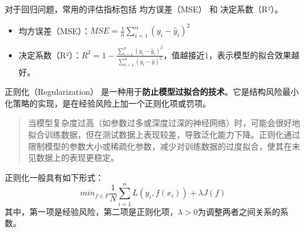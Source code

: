 \documentclass[12pt]{article}
\begin{document}
对于回归问题，常用的评估指标包括 均方误差（MSE） 和 决定系数（R²）。
\begin{itemize}
    \item 均方误差（MSE）：$MSE = \frac{1}{n} \sum_{i=1}^{n} (y_i - \hat{y}_i)^2$
    \item 决定系数（R²）：$R^2 = 1 - \frac{\sum_{i=1}^{n} (y_i - \hat{y}_i)^2}{\sum_{i=1}^{n} (y_i - \bar{y})^2}$，值越接近1，表示模型的拟合效果越好。
\end{itemize}

\noindent{}


正则化（Regularization） 是一种用于\textbf{防止模型过拟合的技术}。它是结构风险最小化策略的实现，是在经验风险上加一个正则化项或罚项。
\begin{quote}
    当模型复杂度过高（如参数过多或深度过深的神经网络）时，可能会很好地拟合训练数据，但在测试数据上表现较差，导致泛化能力下降。正则化通过限制模型的参数大小或稀疏化参数，减少对训练数据的过度拟合，使其在未见数据上的表现更稳定。
\end{quote}
正则化一般具有如下形式：
$$min_{f \in F} \frac{1}{N} \sum_{i=1}^{n} L(y_i, f(x_i)) + \lambda J(f)$$
其中，第一项是经验风险，第二项是正则化项，$\lambda > 0$为调整两者之间关系的系数。
\end{document}
